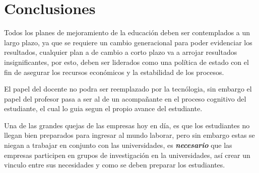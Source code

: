 \documentclass[conference]{IEEEtran}
\begin{document}
%





\section{Conclusiones}
Todos los planes de mejoramiento de la educación deben ser contemplados a un largo plazo, ya que se requiere un cambio generacional para poder evidenciar los resultados, cualquier plan a de cambio a corto plazo va a arrojar resultados insignificantes, por esto, deben ser liderados como una política de estado con el fin de asegurar los recursos económicos y la estabilidad de los procesos.

El papel del docente no podra ser reemplazado por la tecnólogia, sin embargo el papel del profesor pasa a ser al de un acompañante en el proceso cognitivo del estudiante, el cual lo guia segun el propio avance del estudiante.

Una de las grandes quejas de las empresas hoy en día, es que los estudiantes no llegan bien preparados para ingresar al mundo laborar, pero sin embargo estas se niegan a trabajar en conjunto con las universidades, es {\it \bf necesario} que las empresas participen en grupos de investigación en la universidades, así crear un vinculo entre sus necesidades y como se deben preparar los estudiantes.
\end{document}
